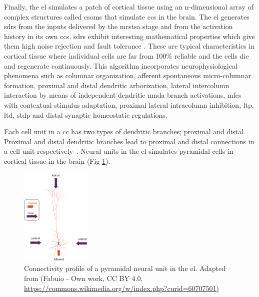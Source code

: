 {Finally, the \gls{el} simulates a patch of cortical tissue using an n-dimensional array of complex structures called \glspl{csom} that simulate \glspl{cc} in the brain. The \gls{el} generates \glspl{sdr} \cite{ahmad_2016} from the inputs delivered by the \gls{mrstsa} stage and from the activation history in its own \glspl{cc}. \glspl{sdr} exhibit interesting mathematical properties which give them high noise rejection and fault tolerance \cite{DBLP:journals/corr/AhmadH15}. These are typical characteristics in cortical tissue where individual cells are far from 100\% reliable and the cells die and regenerate continuously. This algorithm incorporates neurophysiological phenomena such as columnar organization, afferent spontaneous micro-columnar formation, proximal and distal dendritic arborization, lateral intercolumn interaction by means of independent dendritic \gls{nmda} branch activations, \glspl{mfe} with contextual stimulus adaptation, proximal lateral intracolumn inhibition, \gls{ltp}, \gls{ltd}, \gls{stdp} and distal synaptic homeostatic regulations.

Each cell unit in a \gls{cc} has two types of dendritic branches; proximal and distal. Proximal and distal dendritic branches lead to proximal and distal connections in a cell unit respectively~\cite{10.1371/journal.pone.0217966}. Neural units in the \gls{el} simulates pyramidal cells in cortical tissue in the brain (Fig \ref{fig:Pyramidal_Cell}). 

\begin{figure}[h!]
    \centering
    \includegraphics[width=0.3\textwidth]{Pyramidal_Cell.png}
    \caption{Connectivity profile of a pyramidal neural unit in the \gls{el}. Adapted from (Fabuio - Own work, CC BY 4.0, \protect\url{https://commons.wikimedia.org/w/index.php?curid=60707501)}}
    \label{fig:Pyramidal_Cell}
\end{figure}

}
